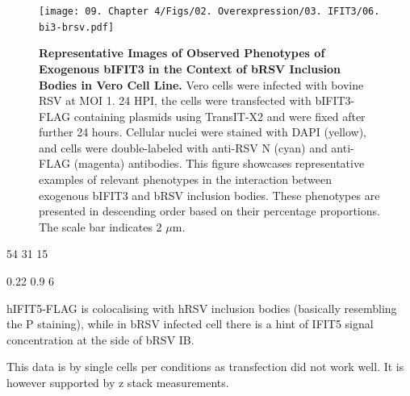 \begin{figure}
    \centering
    \texttt{[image: 09. Chapter 4/Figs/02. Overexpression/03. IFIT3/06. bi3-brsv.pdf]}
    \caption[Representative Images of Observed Phenotypes of Exogenous bIFIT3 in the Context of bRSV Inclusion Bodies in Vero Cell Line.]{\textbf{Representative Images of Observed Phenotypes of Exogenous bIFIT3 in the Context of bRSV Inclusion Bodies in Vero Cell Line.} Vero cells were infected with bovine RSV at MOI 1. 24 HPI, the cells were transfected with bIFIT3-FLAG containing plasmids using TransIT-X2 and were fixed after further 24 hours. Cellular nuclei were stained with DAPI (yellow), and cells were double-labeled with anti-RSV N (cyan) and anti-FLAG (magenta) antibodies. This figure showcases representative examples of relevant phenotypes in the interaction between exogenous bIFIT3 and bRSV inclusion bodies. These phenotypes are presented in descending order based on their percentage proportions. The scale bar indicates 2 \(\mu \mbox{m}\).}
    \label{fig:Representative Images of Observed Phenotypes of Exogenous bIFIT3 in the Context of bRSV Inclusion Bodies in VERO Cell Line}
\end{figure}

54 31 15

0.22 0.9 6

hIFIT5-FLAG is colocalising with hRSV inclusion bodies (basically resembling the P staining), while in bRSV infected cell there is a hint of IFIT5 signal concentration at the side of bRSV IB.

This data is by single cells per conditions as transfection did not work well. It is however supported by z stack measurements.

